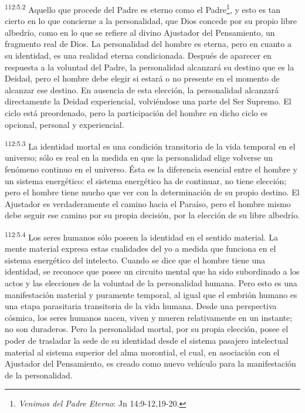 \par
\textsuperscript{112:5.2} Aquello que procede del Padre es eterno como el Padre\footnote{\textit{Venimos del Padre Eterno}: Jn 14:9-12,19-20.}, y esto es tan cierto en lo que concierne a la personalidad, que Dios concede por su propio libre albedrío, como en lo que se refiere al divino Ajustador del Pensamiento, un fragmento real de Dios. La personalidad del hombre es eterna, pero en cuanto a su identidad, es una realidad eterna condicionada. Después de aparecer en respuesta a la voluntad del Padre, la personalidad alcanzará su destino que es la Deidad, pero el hombre debe elegir si estará o no presente en el momento de alcanzar ese destino. En ausencia de esta elección, la personalidad alcanzará directamente la Deidad experiencial, volviéndose una parte del Ser Supremo. El ciclo está preordenado, pero la participación del hombre en dicho ciclo es opcional, personal y experiencial.

\par
\textsuperscript{112:5.3} La identidad mortal es una condición transitoria de la vida temporal en el universo; sólo es real en la medida en que la personalidad elige volverse un fenómeno continuo en el universo. Ésta es la diferencia esencial entre el hombre y un sistema energético: el sistema energético ha de continuar, no tiene elección; pero el hombre tiene mucho que ver con la determinación de su propio destino. El Ajustador es verdaderamente el camino hacia el Paraíso, pero el hombre mismo debe seguir ese camino por su propia decisión, por la elección de su libre albedrío.

\par
\textsuperscript{112:5.4} Los seres humanos sólo poseen la identidad en el sentido material. La mente material expresa estas cualidades del yo a medida que funciona en el sistema energético del intelecto. Cuando se dice que el hombre tiene una identidad, se reconoce que posee un circuito mental que ha sido subordinado a los actos y las elecciones de la voluntad de la personalidad humana. Pero esto es una manifestación material y puramente temporal, al igual que el embrión humano es una etapa parasitaria transitoria de la vida humana. Desde una perspectiva cósmica, los seres humanos nacen, viven y mueren relativamente en un instante; no son duraderos. Pero la personalidad mortal, por su propia elección, posee el poder de trasladar la sede de su identidad desde el sistema pasajero intelectual material al sistema superior del alma morontial, el cual, en asociación con el Ajustador del Pensamiento, es creado como nuevo vehículo para la manifestación de la personalidad.

